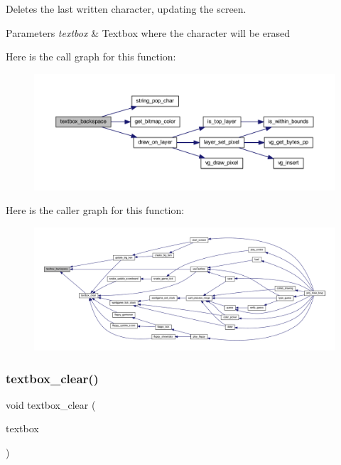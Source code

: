 Deletes the last written character, updating the screen. 


\begin{DoxyParams}{Parameters}
{\em textbox} & Textbox where the character will be erased \\
\hline
\end{DoxyParams}
Here is the call graph for this function\+:\nopagebreak
\begin{figure}[H]
\begin{center}
\leavevmode
\includegraphics[width=350pt]{group__textbox_gaa1d2e3ffe1e358b7d2956e2942859d4b_cgraph}
\end{center}
\end{figure}
Here is the caller graph for this function\+:\nopagebreak
\begin{figure}[H]
\begin{center}
\leavevmode
\includegraphics[width=350pt]{group__textbox_gaa1d2e3ffe1e358b7d2956e2942859d4b_icgraph}
\end{center}
\end{figure}
\mbox{\label{group__textbox_gad6a37472eecd02e21570d33447c740e8}} 
\subsubsection{\texorpdfstring{textbox\+\_\+clear()}{textbox\_clear()}}
{\footnotesize\ttfamily void textbox\+\_\+clear (\begin{DoxyParamCaption}\item[{\mbox{\hyperlink{struct_text_box}{Text\+Box}} $\ast$}]{textbox }\end{DoxyParamCaption})}



